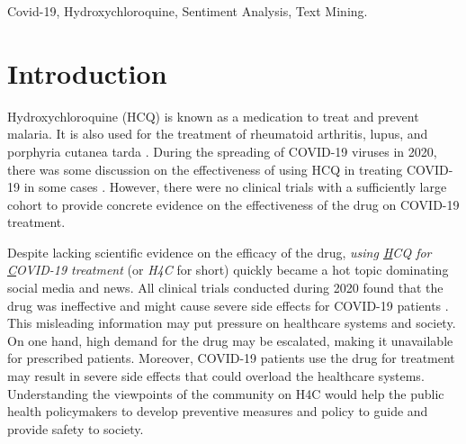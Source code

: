 \documentclass[conference]{IEEEtran}
\begin{document}
\begin{abstract}
	\end{abstract}
	
	\begin{IEEEkeywords}
		Covid-19, Hydroxychloroquine, Sentiment Analysis, Text Mining.
	\end{IEEEkeywords}
	\vspace{-0.1cm}
	\section{Introduction}
	
	
	Hydroxychloroquine (HCQ) is known as a medication to treat and prevent malaria. It is also used for the treatment of rheumatoid arthritis, lupus, and porphyria cutanea tarda \cite{b4}. 
	During the spreading of COVID-19 viruses in 2020, there was some discussion on the effectiveness of using HCQ in treating COVID-19 in some cases \cite{b4}. However, there were no clinical trials with a sufficiently large cohort to provide concrete evidence on the effectiveness of the drug on COVID-19 treatment.
	
	Despite lacking scientific evidence on the efficacy of the drug, \textit{using \underline{H}CQ for \underline{C}OVID-19 treatment} (or \textit{H4C} for short) quickly became a hot topic dominating social media and news. All clinical trials conducted during 2020 found that the drug was ineffective and might cause severe side effects for COVID-19 patients \cite{b4}. This misleading information may put pressure on healthcare systems and society. On one hand, high demand for the drug may be escalated, making it unavailable for prescribed patients. Moreover, COVID-19 patients use the drug for treatment may result in severe side effects that could overload the healthcare systems. Understanding the viewpoints of the community on H4C would help the public health policymakers to develop preventive measures and policy to guide and provide safety to society.
	
\end{document}

